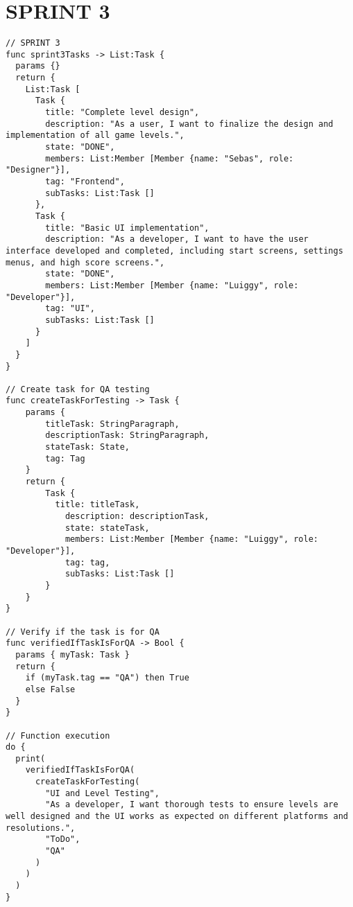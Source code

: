 \documentclass{article}
\begin{document}
\section{SPRINT 3}
\begin{verbatim}
// SPRINT 3
func sprint3Tasks -> List:Task {
  params {}
  return {
    List:Task [
      Task {
        title: "Complete level design",
        description: "As a user, I want to finalize the design and implementation of all game levels.",
        state: "DONE",
        members: List:Member [Member {name: "Sebas", role: "Designer"}],
        tag: "Frontend",
        subTasks: List:Task []
      },
      Task {
        title: "Basic UI implementation",
        description: "As a developer, I want to have the user interface developed and completed, including start screens, settings menus, and high score screens.",
        state: "DONE",
        members: List:Member [Member {name: "Luiggy", role: "Developer"}],
        tag: "UI",
        subTasks: List:Task []
      }
    ]
  }
}

// Create task for QA testing
func createTaskForTesting -> Task {
    params {
        titleTask: StringParagraph,
        descriptionTask: StringParagraph,
        stateTask: State,
        tag: Tag
    }
    return {
        Task {
          title: titleTask,
	        description: descriptionTask,
	        state: stateTask,
	        members: List:Member [Member {name: "Luiggy", role: "Developer"}],
	        tag: tag,
	        subTasks: List:Task []
        }
    }
}

// Verify if the task is for QA
func verifiedIfTaskIsForQA -> Bool {
  params { myTask: Task }
  return {
    if (myTask.tag == "QA") then True
    else False
  }
}

// Function execution
do {
  print(
    verifiedIfTaskIsForQA(
      createTaskForTesting(
        "UI and Level Testing", 
        "As a developer, I want thorough tests to ensure levels are well designed and the UI works as expected on different platforms and resolutions.", 
        "ToDo", 
        "QA"
      )
    )
  )
}
\end{verbatim}
\end{document}
